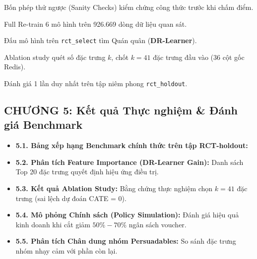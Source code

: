 \begin{itemize}[leftmargin=*]
\begin{*itemize}
        \item Bốn phép thử ngược (Sanity Checks) kiểm chứng công thức trước khi chấm điểm.
        \item Full Re-train 6 mô hình trên 926.669 dòng dữ liệu quan sát.
        \item Đấu mô hình trên \texttt{rct\_select} tìm Quán quân (\textbf{DR-Learner}).
        \item Ablation study quét số đặc trưng $k$, chốt $k=41$ đặc trưng đầu vào (36 cột gốc Redis).
        \item Đánh giá 1 lần duy nhất trên tập niêm phong \texttt{rct\_holdout}.
    \end{*itemize}
\end{itemize}

\subsection*{CHƯƠNG 5: Kết quả Thực nghiệm \& Đánh giá Benchmark}
\begin{itemize}[leftmargin=*]
    \item \textbf{5.1. Bảng xếp hạng Benchmark chính thức trên tập RCT-holdout:}
    \item \textbf{5.2. Phân tích Feature Importance (DR-Learner Gain):} Danh sách Top 20 đặc trưng quyết định hiệu ứng điều trị.
    \item \textbf{5.3. Kết quả Ablation Study:} Bằng chứng thực nghiệm chọn $k=41$ đặc trưng (sai lệch dự đoán CATE = 0).
    \item \textbf{5.4. Mô phỏng Chính sách (Policy Simulation):} Đánh giá hiệu quả kinh doanh khi cắt giảm $50\% - 70\%$ ngân sách voucher.
    \item \textbf{5.5. Phân tích Chân dung nhóm Persuadables:} So sánh đặc trưng nhóm nhạy cảm với phần còn lại.
\end{itemize}

